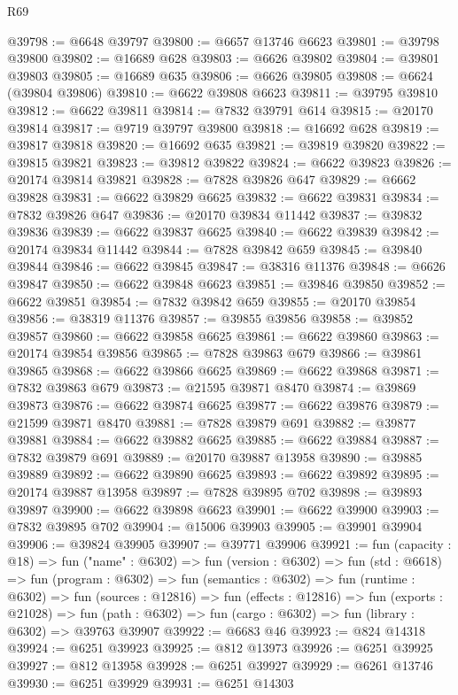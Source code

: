 \begin{lexlean}{R69}
\begin{coremodule}
{@39798 := @6648 @39797
@39800 := @6657 @13746 @6623
@39801 := @39798 @39800
@39802 := @16689 @628
@39803 := @6626 @39802
@39804 := @39801 @39803
@39805 := @16689 @635
@39806 := @6626 @39805
@39808 := @6624 (@39804 @39806)
@39810 := @6622 @39808 @6623
@39811 := @39795 @39810
@39812 := @6622 @39811
@39814 := @7832 @39791 @614
@39815 := @20170 @39814
@39817 := @9719 @39797 @39800
@39818 := @16692 @628
@39819 := @39817 @39818
@39820 := @16692 @635
@39821 := @39819 @39820
@39822 := @39815 @39821
@39823 := @39812 @39822
@39824 := @6622 @39823
@39826 := @20174 @39814 @39821
@39828 := @7828 @39826 @647
@39829 := @6662 @39828
@39831 := @6622 @39829 @6625
@39832 := @6622 @39831
@39834 := @7832 @39826 @647
@39836 := @20170 @39834 @11442
@39837 := @39832 @39836
@39839 := @6622 @39837 @6625
@39840 := @6622 @39839
@39842 := @20174 @39834 @11442
@39844 := @7828 @39842 @659
@39845 := @39840 @39844
@39846 := @6622 @39845
@39847 := @38316 @11376
@39848 := @6626 @39847
@39850 := @6622 @39848 @6623
@39851 := @39846 @39850
@39852 := @6622 @39851
@39854 := @7832 @39842 @659
@39855 := @20170 @39854
@39856 := @38319 @11376
@39857 := @39855 @39856
@39858 := @39852 @39857
@39860 := @6622 @39858 @6625
@39861 := @6622 @39860
@39863 := @20174 @39854 @39856
@39865 := @7828 @39863 @679
@39866 := @39861 @39865
@39868 := @6622 @39866 @6625
@39869 := @6622 @39868
@39871 := @7832 @39863 @679
@39873 := @21595 @39871 @8470
@39874 := @39869 @39873
@39876 := @6622 @39874 @6625
@39877 := @6622 @39876
@39879 := @21599 @39871 @8470
@39881 := @7828 @39879 @691
@39882 := @39877 @39881
@39884 := @6622 @39882 @6625
@39885 := @6622 @39884
@39887 := @7832 @39879 @691
@39889 := @20170 @39887 @13958
@39890 := @39885 @39889
@39892 := @6622 @39890 @6625
@39893 := @6622 @39892
@39895 := @20174 @39887 @13958
@39897 := @7828 @39895 @702
@39898 := @39893 @39897
@39900 := @6622 @39898 @6623
@39901 := @6622 @39900
@39903 := @7832 @39895 @702
@39904 := @15006 @39903
@39905 := @39901 @39904
@39906 := @39824 @39905
@39907 := @39771 @39906
@39921 := fun (capacity : @18) =>
  fun ("name" : @6302) =>
  fun (version : @6302) =>
  fun (std : @6618) =>
  fun (program : @6302) =>
  fun (semantics : @6302) =>
  fun (runtime : @6302) =>
  fun (sources : @12816) =>
  fun (effects : @12816) =>
  fun (exports : @21028) =>
  fun (path : @6302) => fun (cargo : @6302) => fun (library : @6302) => @39763 @39907
@39922 := @6683 @46
@39923 := @824 @14318
@39924 := @6251 @39923
@39925 := @812 @13973
@39926 := @6251 @39925
@39927 := @812 @13958
@39928 := @6251 @39927
@39929 := @6261 @13746
@39930 := @6251 @39929
@39931 := @6251 @14303
}
\end{coremodule}
\end{lexlean}
